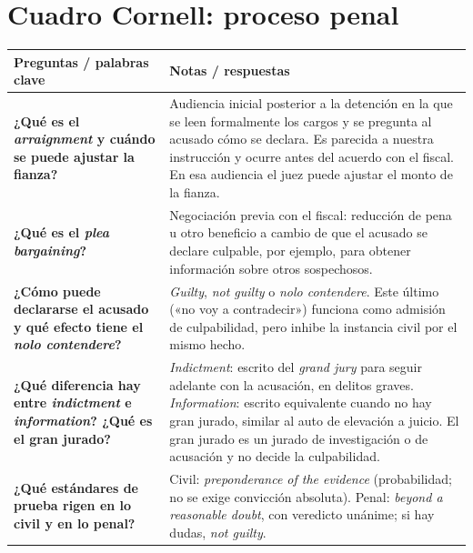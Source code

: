 \documentclass[12pt,oneside]{book}
\begin{document}
\section{Cuadro Cornell: proceso penal}

\begin{table}[H]
\centering
\begin{tabularx}{\textwidth}{
    >{\raggedright\arraybackslash}p{}
    >{\raggedright\arraybackslash}X
}
\toprule
\textbf{Preguntas / palabras clave} &
\textbf{Notas / respuestas} \\
\midrule

\textbf{¿Qué es el \textit{arraignment} y cuándo se puede ajustar la fianza?} &
Audiencia inicial posterior a la detención en la que se leen formalmente los cargos y se pregunta al acusado cómo se declara. Es parecida a nuestra instrucción y ocurre antes del acuerdo con el fiscal. En esa audiencia el juez puede ajustar el monto de la fianza. \\
\midrule[0.3pt]

\textbf{¿Qué es el \textit{plea bargaining}?} &
Negociación previa con el fiscal: reducción de pena u otro beneficio a cambio de que el acusado se declare culpable, por ejemplo, para obtener información sobre otros sospechosos. \\
\midrule[0.3pt]

\textbf{¿Cómo puede declararse el acusado y qué efecto tiene el \textit{nolo contendere}?} &
\textit{Guilty}, \textit{not guilty} o \textit{nolo contendere}. Este último («no voy a contradecir») funciona como admisión de culpabilidad, pero inhibe la instancia civil por el mismo hecho. \\
\midrule[0.3pt]

\textbf{¿Qué diferencia hay entre \textit{indictment} e \textit{information}? ¿Qué es el gran jurado?} &
\textit{Indictment}: escrito del \textit{grand jury} para seguir adelante con la acusación, en delitos graves. \textit{Information}: escrito equivalente cuando no hay gran jurado, similar al auto de elevación a juicio. El gran jurado es un jurado de investigación o de acusación y no decide la culpabilidad. \\
\midrule[0.3pt]

\textbf{¿Qué estándares de prueba rigen en lo civil y en lo penal?} &
Civil: \textit{preponderance of the evidence} (probabilidad; no se exige convicción absoluta). Penal: \textit{beyond a reasonable doubt}, con veredicto unánime; si hay dudas, \textit{not guilty}. \\


\end{tabularx}
\end{table}
\end{document}
